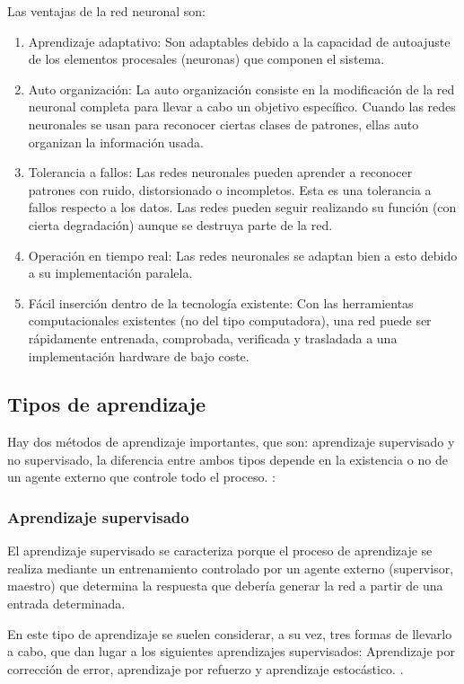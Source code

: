 Las ventajas de la red neuronal son:
\begin{enumerate}
\item Aprendizaje adaptativo: Son adaptables debido a la capacidad de autoajuste de los elementos procesales (neuronas) que componen el sistema.
\item Auto organización: La auto organización consiste en la modificación de la red neuronal completa para llevar a cabo un objetivo específico. Cuando las redes neuronales se usan para reconocer ciertas clases de patrones, ellas auto organizan la información usada.
\item Tolerancia a fallos: Las redes neuronales pueden aprender a reconocer patrones con ruido, distorsionado o incompletos. Esta es una tolerancia a fallos respecto a los datos. Las redes pueden seguir realizando su función (con cierta degradación) aunque se destruya parte de la red.
\item Operación en tiempo real: Las redes neuronales se adaptan bien a esto debido a su implementación paralela.
\item Fácil inserción dentro de la tecnología existente: Con las herramientas computacionales existentes (no del tipo computadora), una red puede ser rápidamente entrenada, comprobada, verificada y trasladada a una implementación hardware de bajo coste.
\end{enumerate}

\subsection{Tipos de aprendizaje}
Hay dos métodos de aprendizaje importantes, que son: aprendizaje supervisado y no supervisado, la diferencia entre ambos tipos depende en la existencia o no de un agente externo que controle todo el proceso. \citep{matich2001redes}:

\subsubsection{Aprendizaje supervisado}
El aprendizaje supervisado se caracteriza porque el proceso de aprendizaje se realiza mediante un entrenamiento controlado por un agente externo (supervisor, maestro) que determina la respuesta que debería generar la red a partir de una entrada determinada.

En este tipo de aprendizaje se suelen considerar, a su vez, tres formas de llevarlo a cabo, que dan lugar a los siguientes aprendizajes supervisados: Aprendizaje por corrección de error, aprendizaje por refuerzo y aprendizaje estocástico. \citep{matich2001redes}.

